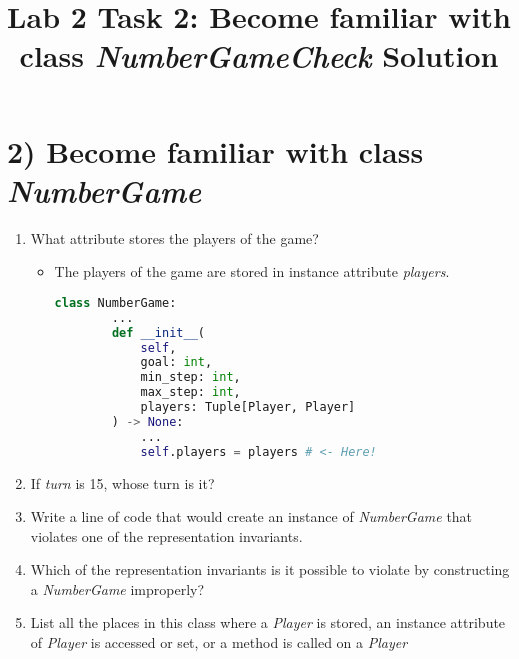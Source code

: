 \documentclass[12pt]{article}
\begin{document}
\title{Lab 2 Task 2: Become familiar with class \textit{NumberGameCheck} Solution}
\date{}
\maketitle

\section*{2) Become familiar with class \textit{NumberGame}}
\begin{enumerate}[1.]
    \item What attribute stores the players of the game?

    \begin{itemize}
    \item The players of the game are stored in instance attribute \textit{players}.

    \begin{lstlisting}[language=Python]
    class NumberGame:
        ...
        def __init__(
            self,
            goal: int,
            min_step: int,
            max_step: int,
            players: Tuple[Player, Player]
        ) -> None:
            ...
            self.players = players # <- Here!
    \end{lstlisting}
    \end{itemize}

    \item If \textit{turn} is 15, whose turn is it?
    \item Write a line of code that would create an instance of \textit{NumberGame}
    that violates one of the representation invariants.
    \item Which of the representation invariants is it possible to violate by
    constructing a \textit{NumberGame} improperly?
    \item List all the places in this class where a \textit{Player} is stored, an instance
    attribute of \textit{Player} is accessed or set, or a method is called on a \textit{Player}
\end{enumerate}
\end{document}
